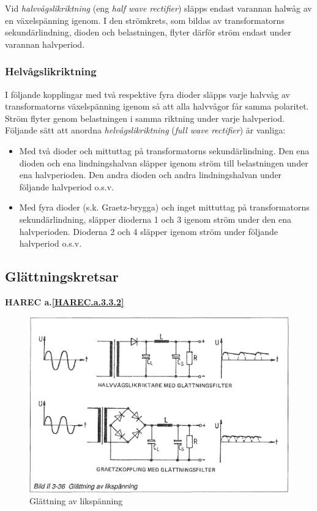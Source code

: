 Vid \emph{halvvågslikriktning} (eng \emph{half wave rectifier}) släpps endast
varannan halwåg av en växelspänning igenom. I den strömkrets, som bildas av
transformatorns sekundärlindning, dioden och belastningen, flyter därför ström
endast under varannan halvperiod.

\subsubsection{Helvågslikriktning}

I följande kopplingar med två respektive fyra dioder släpps varje
halvvåg av transformatorns växelspänning igenom så att alla halvvågor
får samma polaritet. Ström flyter genom belastningen i samma riktning
under varje halvperiod. Följande sätt att anordna \emph{helvågslikriktning}
(\emph{full wave rectifier}) är vanliga:
\begin{itemize}
\item Med två dioder och mittuttag på transformatorns
  sekundärlindning. Den ena dioden och ena lindningshalvan släpper
  igenom ström till belastningen under ena halvperioden. Den andra
  dioden och andra lindningshalvan under följande halvperiod o.s.v.

\item Med fyra dioder (s.k. Graetz-brygga) och inget mittuttag på
  transformatorns sekundärlindning, släpper dioderna 1 och 3 igenom
  ström under den ena halvperioden.  Dioderna 2 och 4 släpper igenom
  ström under följande halvperiod o.s.v.
\end{itemize}

\subsection{Glättningskretsar}
\textbf{HAREC a.\ref{HAREC.a.3.3.2}\label{myHAREC.a.3.3.2}}

\begin{figure}
\includegraphics[width=\textwidth]{images/bild_2_3-36}
\caption{Glättning av likspänning}
\label{fig:BildII3-36}
\end{figure}

